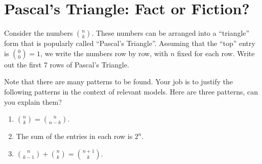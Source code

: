 \newpage
\section{Pascal's Triangle: Fact or Fiction?}\label{A:factOrFiction}

Consider the numbers $\binom{n}{k}$.  These numbers can be arranged
into a ``triangle'' form that is popularly called ``Pascal's
Triangle''.  Assuming that the ``top'' entry is $\binom{0}{0}=1$, we
write the numbers row by row, with $n$ fixed for each row.  Write out
the first 7 rows of Pascal's Triangle.

\vspace{3in}


Note that there are many patterns to be found.  Your job is to justify
the following patterns in the context of relevant models. Here are three patterns, can you explain them?
\begin{enumerate}
\item $\binom{n}{k} = \binom{n}{n-k}$.
\item The sum of the entries in each row is $2^n$.
\item $\binom{n}{k-1} + \binom{n}{k} = \binom{n+1}{k}$.
\end{enumerate}

